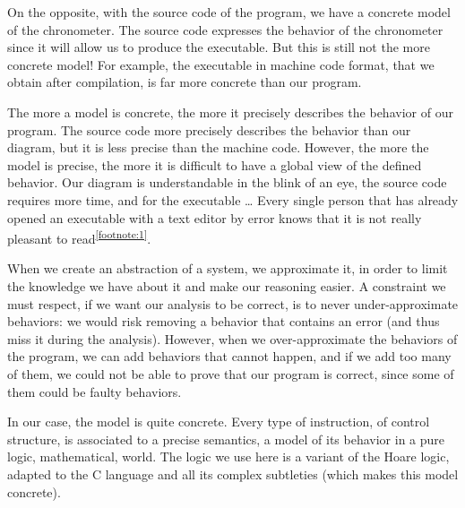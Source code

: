 On the opposite, with the source code of the program, we have a concrete
model of the chronometer. The source code expresses the behavior of the
chronometer since it will allow us to produce the executable. But this
is still not the more concrete model! For example, the executable in
machine code format, that we obtain after compilation, is far more
concrete than our program.



The more a model is concrete, the more it precisely describes the
behavior of our program. The source code more precisely describes the
behavior than our diagram, but it is less precise than the machine code.
However, the more the model is precise, the more it is difficult to have
a global view of the defined behavior. Our diagram is understandable in
the blink of an eye, the source code requires more time, and for the
executable \ldots{} Every single person that has already opened an
executable with a text editor by error knows that it is not really
pleasant to read\textsuperscript{\ref{footnote:1}}.



When we create an abstraction of a system, we approximate it, in order
to limit the knowledge we have about it and make our reasoning easier. A
constraint we must respect, if we want our analysis to be correct, is to
never under-approximate behaviors: we would risk removing a behavior
that contains an error (and thus miss it during the analysis). However,
when we over-approximate the behaviors of the program, we can add
behaviors that cannot happen, and if we add too many of them, we could
not be able to prove that our program is correct, since some of them could be
faulty behaviors.



In our case, the model is quite concrete. Every type of instruction, of
control structure, is associated to a precise semantics, a model of its
behavior in a pure logic, mathematical, world. The logic we use here is
a variant of the Hoare logic, adapted to the C language and all its
complex subtleties (which makes this model concrete).






